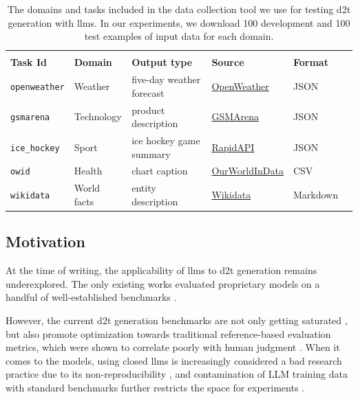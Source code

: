 \begin{table}[ht]
    \small
    \centering
    \begin{tabular}{@{}llllll@{}} \toprule                                                                                                                  \\
        \textbf{Task Id}     & \textbf{Domain} & \textbf{Output type}      & \textbf{Source}                                   & \textbf{Format} \\ \midrule
        \texttt{openweather} & Weather         & five-day weather forecast & \href{https://openweathermap.org}{OpenWeather}    & JSON            \\
        \texttt{gsmarena}    & Technology      & product description       & \href{https://www.gsmarena.com}{GSMArena}         & JSON            \\
        \texttt{ice\_hockey} & Sport           & ice hockey game summary   & \href{https://rapidapi.com}{RapidAPI}             & JSON            \\
        \texttt{owid}        & Health          & chart caption             & \href{https://ourworldindata.org}{OurWorldInData} & CSV             \\
        \texttt{wikidata}    & World facts     & entity description        & \href{https://wikidata.org}{Wikidata}             & Markdown        \\\bottomrule
    \end{tabular}
    \caption{The domains and tasks included in the \datatool{} data collection tool we use for testing \ac{d2t} generation with \acp{llm}. In our experiments, we download 100 development and 100 test examples of input data for each domain.}
    \label{tab:quintd:data}
\end{table}

\subsection{Motivation}
At the time of writing, the applicability of \acp{llm} \cite{ouyang2022TrainingLM,touvronLlamaOpenFoundation2023,jiangMistral7B2023,tunstallZephyrDirectDistillation2023} to \ac{d2t} generation remains underexplored. The only existing works evaluated proprietary models on a handful of well-established benchmarks \cite{axelssonUsingLargeLanguage2023,yuanEvaluatingGenerativeModels2023}.

However, the current \ac{d2t} generation benchmarks are not only getting saturated \cite{van_miltenburg_barriers_2023}, but also promote optimization towards traditional reference-based evaluation metrics, which were shown to correlate poorly with human judgment \cite{gehrmannRepairingCrackedFoundation2022,vanderleeHumanEvaluationAutomatically2021,novikovaWhyWeNeed2017}. When it comes to the models, using closed \acp{llm} \cite{openai2023gpt4,chatgpt} is increasingly considered a bad research practice due to its non-reproducibility \cite{rogers2023closed,chen2023chatgpt}, and contamination of LLM training data with standard benchmarks further restricts the space for experiments \cite{golchin2023time,aiyappa-etal-2023-trust,balloccu2024leak}.

